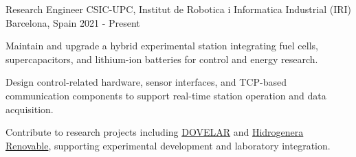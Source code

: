 \cventry
  {Research Engineer}
  {CSIC-UPC, Institut de Robotica i Informatica Industrial (IRI)}
  {Barcelona, Spain}
  {2021 - Present}
  {
    \begin{cvitems}
      \item {Maintain and upgrade a hybrid experimental station integrating fuel cells, supercapacitors, and lithium-ion batteries for control and energy research.}
      \item {Design control-related hardware, sensor interfaces, and TCP-based communication components to support real-time station operation and data acquisition.}
      \item {Contribute to research projects including \href{https://www.iri.upc.edu/project/show/225}{DOVELAR} and \href{https://pti-transener.csic.es/hidrogenera-renovable-60-kg-h2-dia/}{Hidrogenera Renovable}, supporting experimental development and laboratory integration.}
    \end{cvitems}
  }
